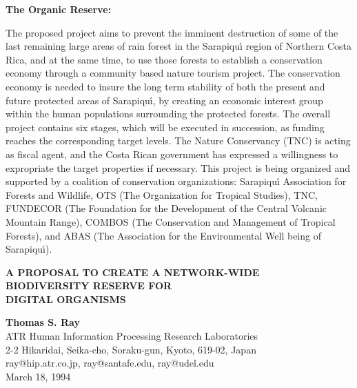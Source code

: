 \begin{center}
{\bf The Organic Reserve:}
\end{center}

The proposed project aims to prevent the imminent destruction of
some of the last remaining large areas of rain forest in the
Sarapiqu\'{\i} region of Northern Costa Rica, and at the same time,
to use those forests to establish a conservation economy through a
community based nature tourism project.  The conservation economy is
needed to insure the long term stability of both the present and future
protected areas of Sarapiqu\'{\i}, by creating an economic interest group
within the human populations surrounding the protected forests.  The
overall project contains six stages, which will be executed in succession,
as funding reaches the corresponding target levels.  The Nature Conservancy
(TNC) is acting as fiscal agent, and the Costa Rican government has expressed
a willingness to expropriate the target properties if necessary.  This
project is being organized and supported by a coalition of conservation
organizations: Sarapiqu\'{\i} Association for Forests and Wildlife,
OTS (The Organization for Tropical Studies), TNC, FUNDECOR (The Foundation
for the Development of the Central Volcanic Mountain Range), COMBOS (The
Conservation and Management of Tropical Forests), and ABAS (The Association
for the Environmental Well being of Sarapiqu\'{\i}).

\newpage
\setcounter{page}{1}

\begin{center}
{\Large {\bf
A PROPOSAL TO CREATE A NETWORK-WIDE\\
BIODIVERSITY RESERVE FOR\\
DIGITAL ORGANISMS\\
}}
\end{center}

\LP
{\bf Thomas S. Ray} \\
ATR Human Information Processing Research Laboratories\\
2-2 Hikaridai, Seika-cho, Soraku-gun, Kyoto, 619-02, Japan\\
ray@hip.atr.co.jp, ray@santafe.edu, ray@udel.edu\\
March 18, 1994\\
\eLP

